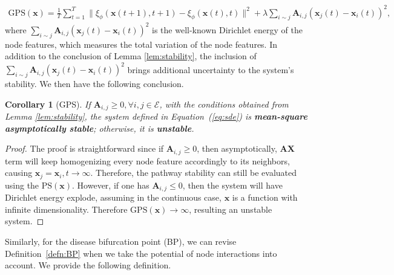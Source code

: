 \documentclass{article} %
\newtheorem{cor}{Corollary}
\begin{document}
\begin{align}
     \mathrm{GPS} (\mathbf x) = \frac1T \sum_{t=1}^T\|\xi_{\phi}(\mathbf{x}(t+1), t+1) - \xi_{\phi}(\mathbf{x}(t), t)\|^2 + \lambda \sum_{i\sim j} \mathbf A_{i,j} (\mathbf x_j(t) - \mathbf x_i(t))^2,
\end{align}
where $\sum_{i\sim j} \mathbf A_{i,j} (\mathbf x_j(t) - \mathbf x_i(t))^2$ is the well-known Dirichlet energy of the node features, which measures the total variation of the node features. In addition to the conclusion of Lemma \eqref{lem:stability}, the inclusion of $\sum_{i\sim j} \mathbf A_{i,j} (\mathbf x_j(t) - \mathbf x_i(t))^2$ brings additional uncertainty to the system's stability. We then have the following conclusion.
\begin{cor}[GPS]\label{cor:gps}
    If $\mathbf A_{i,j} \geq 0, \forall i,j \in \mathcal E$, with the conditions obtained from Lemma \ref{lem:stability}, the system defined in Equation~(\ref{eq:sde}) is \textbf{mean-square asymptotically stable}; otherwise, it is\textbf{ unstable}. 
\end{cor}
\begin{proof}
    The proof is straightforward since if $\mathbf A_{i,j} \geq 0$, then asymptotically, $\mathbf A\mathbf X$ term will keep homogenizing every node feature accordingly to its neighbors, causing $\mathbf x_j = \mathbf x_i, t \rightarrow \infty$. Therefore, the pathway stability can still be evaluated using the $\mathrm{PS}(\mathbf x)$. However, if one has $\mathbf A_{i,j} \leq 0$, then the system will have Dirichlet energy explode, assuming in the continuous case, $\mathbf x$ is a function with infinite dimensionality. Therefore $\mathrm{GPS} (\mathbf x) \rightarrow \infty$, resulting an unstable system. 
\end{proof}

Similarly, for the disease bifurcation point (BP), we can revise Definition~\ref{defn:BP} when we take the potential of node interactions into account. We provide the following definition. 
\end{document}
